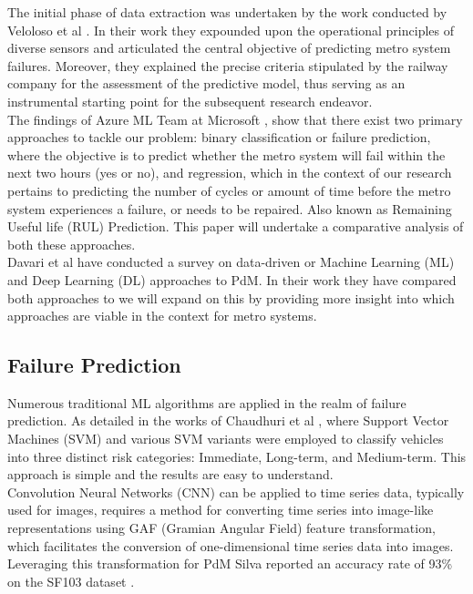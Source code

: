 \documentclass{article}
\begin{document}
The initial phase of data extraction was
undertaken by the work conducted by Veloloso et al \cite{Veloso2022}. In their work they expounded upon the operational principles of diverse sensors
and articulated the central objective of predicting metro system failures. 
Moreover, they explained the precise criteria stipulated by the railway company for the assessment of the predictive model, thus serving as an instrumental starting point for the subsequent research endeavor. \\

The findings of Azure ML Team at Microsoft \cite{AzureML2015}, show that there exist two primary approaches to tackle our problem: binary classification or failure prediction, where the objective is to predict whether the metro system will fail within the next two hours (yes or no), and regression, which in the context of our research pertains to predicting the number of cycles or amount of time before the metro system experiences a failure, or needs to be repaired. Also known as Remaining Useful life (RUL) Prediction. This paper will undertake a comparative analysis of both these approaches. \\

Davari et al \cite{Davari2021} have conducted a survey on data-driven or Machine Learning (ML) and Deep Learning (DL) approaches to PdM. In their work they have compared both approaches to we will expand on this by providing more insight into which approaches are viable in the context for metro systems.

\subsection{Failure Prediction}

Numerous traditional ML algorithms are applied in the realm of failure prediction. As detailed in the works of Chaudhuri et al \cite{chaudhuri2018}, where Support Vector Machines (SVM) and various SVM variants were employed to classify vehicles into three distinct risk categories: Immediate, Long-term, and Medium-term. This approach is simple and the results are easy to understand. \\

Convolution Neural Networks (CNN) can be applied to time series data, typically used for
images, requires a method for converting time series into image-like representations using GAF (Gramian Angular Field) feature transformation, which facilitates the conversion of one-dimensional time series data into images. Leveraging this transformation for PdM Silva reported an accuracy rate of 93\% on the SF103 dataset \cite{Silva2019}. \\
\end{document}
